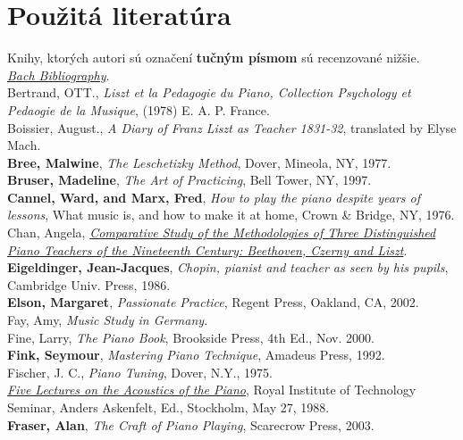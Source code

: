 \chapter*{Použitá literatúra}
Knihy, ktorých autori sú označení \textbf{tučným písmom} sú recenzované nižšie.
\medskip\\
\href{http://www.music.qub.ac.uk/tomita/bachbib/}{\textit{Bach Bibliography}}.\\
Bertrand, OTT., \textit{Liszt et la Pedagogie du Piano, Collection Psychology et Pedaogie de la Musique}, (1978) E. A. P. France.\\
\noindent Boissier, August., \textit{A Diary of Franz Liszt as Teacher 1831-32}, translated by Elyse Mach.\\
\textbf{Bree, Malwine}, \textit{The Leschetizky Method}, Dover, Mineola, NY, 1977.\\
\textbf{Bruser, Madeline}, \textit{The Art of Practicing}, Bell Tower, NY, 1997.\\
\textbf{Cannel, Ward, and Marx, Fred}, \textit{How to play the piano despite years of lessons}, What music is, and how to make it at home, Crown \& Bridge, NY, 1976.\\
Chan, Angela, \href{http://www.geocities.com/Paris/Metro/5453/maped.htm}{\textit{Comparative Study of the Methodologies of Three Distinguished Piano Teachers of the Nineteenth Century: Beethoven, Czerny and Liszt}}.\\
\textbf{Eigeldinger, Jean-Jacques}, \textit{Chopin, pianist and teacher as seen by his pupils}, Cambridge Univ. Press, 1986.\\
\textbf{Elson, Margaret}, \textit{Passionate Practice}, Regent Press, Oakland, CA, 2002.\\
Fay, Amy, \textit{Music Study in Germany}.\\
Fine, Larry, \textit{The Piano Book}, Brookside Press, 4th Ed., Nov. 2000.\\
\textbf{Fink, Seymour}, \textit{Mastering Piano Technique}, Amadeus Press, 1992.\\
Fischer, J. C., \textit{Piano Tuning}, Dover, N.Y., 1975.\\
\href{http://www.speech.kth.se/music/5_lectures/contents.html}{\textit{Five Lectures on the Acoustics of the Piano}}, Royal Institute of Technology Seminar, Anders Askenfelt, Ed., Stockholm, May 27, 1988.\\
\textbf{Fraser, Alan}, \textit{The Craft of Piano Playing}, Scarecrow Press, 2003.\\
